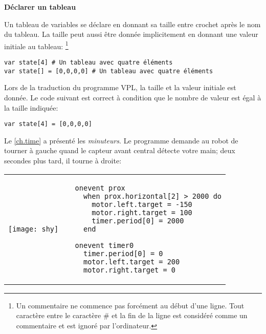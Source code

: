 \textbf{\large Déclarer un tableau}

Un tableau de variables se déclare en donnant sa taille entre crochet après le nom du tableau.
La taille peut aussi être donnée implicitement en donnant une valeur initiale au tableau:
\footnote{Un commentaire ne commence pas forcément au début d'une ligne.
Tout caractère entre le caractère \# et la fin de la ligne est considéré comme un commentaire et est ignoré par l'ordinateur.}

\begin{footnotesize}
\begin{verbatim}
var state[4] # Un tableau avec quatre éléments
var state[] = [0,0,0,0] # Un tableau avec quatre éléments
\end{verbatim}
\end{footnotesize}

Lors de la traduction du programme VPL, la taille et la valeur initiale est donnée.
Le code suivant est correct à condition que le nombre de valeur est égal à la taille indiquée:

\begin{footnotesize}
\begin{verbatim}
var state[4] = [0,0,0,0]
\end{verbatim}
\end{footnotesize}

\newpage


Le \cref{ch.time} a présenté les \emph{minuteurs}.
Le programme  demande au robot de tourner à gauche quand le capteur avant central
détecte votre main; deux secondes plus tard, il tourne à droite:

\begin{center}
\begin{tabular}{ll}
\texttt{[image: shy]} &
\begin{minipage}[b]{.5\textwidth}
\begin{footnotesize}
\begin{verbatim}
  onevent prox
    when prox.horizontal[2] > 2000 do
      motor.left.target = -150
      motor.right.target = 100
      timer.period[0] = 2000
    end
  
  onevent timer0
    timer.period[0] = 0
    motor.left.target = 200
    motor.right.target = 0
\end{verbatim}
\end{footnotesize}
\end{minipage}
\end{tabular}
\end{center}

